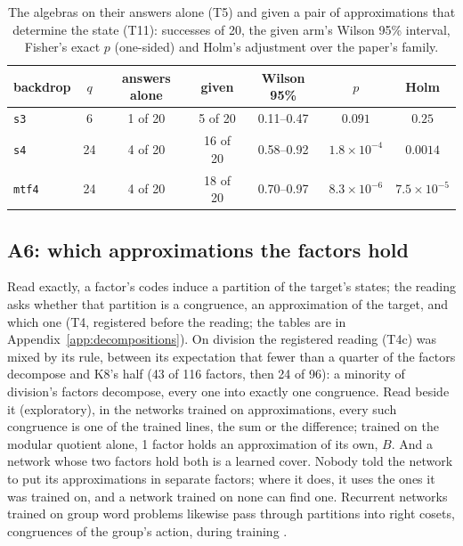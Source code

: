 \documentclass[11pt]{article}
\newcommand{\pn}[2]{#2}
\begin{document}
\begin{table}[t]
\centering
\caption{The algebras on their answers alone (T5) and given a pair of approximations that determine
the state (T11): successes of 20, the given arm's Wilson 95\% interval, Fisher's exact $p$
(one-sided) and Holm's adjustment over the paper's family.}
\label{tab:groups}
\begin{tabular}{lcccccc}
\toprule
backdrop & $q$ & answers alone & given & Wilson 95\% & $p$ & Holm \\
\midrule
\texttt{s3} & 6 & 1 of 20 & 5 of 20 & 0.11--0.47 & $0.091$ & $0.25$ \\
\texttt{s4} & 24 & 4 of 20 & 16 of 20 & 0.58--0.92 & $1.8 \times 10^{-4}$ & $0.0014$ \\
\texttt{mtf4} & 24 & 4 of 20 & 18 of 20 & 0.70--0.97 & $8.3 \times 10^{-6}$ & $7.5 \times 10^{-5}$ \\
\bottomrule
\end{tabular}
\end{table}

\subsection{A6: which approximations the factors hold}
\label{sec:a6}

Read exactly, a factor's codes induce a partition of the target's states; the reading asks whether
that partition is a congruence, an approximation of the target, and which one (T4, registered
before the reading; the tables are in Appendix~\ref{app:decompositions}). On division the registered reading (T4c) was mixed by its rule, between its expectation that fewer
than a quarter of the factors decompose and K8's half (\pn{k8.division-first}{43 of 116} factors, then
\pn{k8.division-fresh}{24 of 96}): a
minority of division's factors decompose, \pn{k8.division-one-line}{every} one into exactly one
congruence. Read beside it (exploratory), in the networks trained on approximations, \pn{k8.division-trained-lines}{every} such
congruence is one of the trained lines, the sum or the difference; trained on the modular quotient alone,
\pn{k8.division-untrained}{1} factor holds an approximation of its own, $B$. And a network whose two factors hold both is a learned cover. Nobody told
the network to put its approximations in separate factors; where it does, it uses the ones it was
trained on, and a network trained on none can find one. Recurrent networks trained on group word problems likewise
pass through partitions into right cosets, congruences of the group's action, during training
\citep{zhang-2026-tracking-states-or-cosets}.
\end{document}
